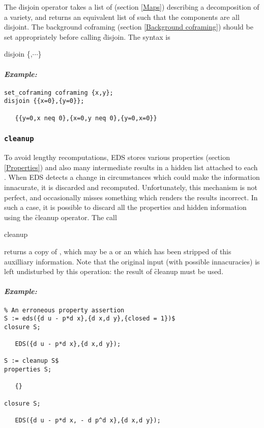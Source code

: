 The \f{disjoin} operator takes a list of  (section \ref{Maps})
describing a decomposition of a variety, and returns an equivalent list of
 such that the components are all disjoint. The background
coframing (section \ref{Background coframing}) should be set appropriately
before calling \f{disjoin}. The syntax is
\begin{edssyntax}
	disjoin \{,$\cdots$\}
\end{edssyntax}

\paragraph{\it Example:}
\begin{verbatim}
set_coframing coframing {x,y};
disjoin {{x=0},{y=0}};

   {{y=0,x neq 0},{x=0,y neq 0},{y=0,x=0}}
\end{verbatim}

\subsubsection{\tt cleanup}
\label{cleanup}

To avoid lengthy recomputations, EDS stores various properties (section
\ref{Properties}) and also many intermediate results in a hidden list
attached to each . When EDS detects a change in circumstances
which could make the information innacurate, it is discarded and
recomputed. Unfortunately, this mechanism is not perfect, and occasionally
misses something which renders the results incorrect. In such a case, it is
possible to discard all the properties and hidden information using the
\f{cleanup} operator. The call
\begin{edssyntax}
	cleanup 
\end{edssyntax}
returns a copy of , which may be a  or an
 which has been stripped of this auxilliary information. Note
that the original input (with possible innacuracies) is left undisturbed by
this operation: the result of \f{cleanup} must be used.

\paragraph{\it Example:}
\begin{verbatim}
% An erroneous property assertion
S := eds({d u - p*d x},{d x,d y},{closed = 1})$
closure S;

   EDS({d u - p*d x},{d x,d y});

S := cleanup S$
properties S;

   {}

closure S;

   EDS({d u - p*d x, - d p^d x},{d x,d y});
\end{verbatim}

